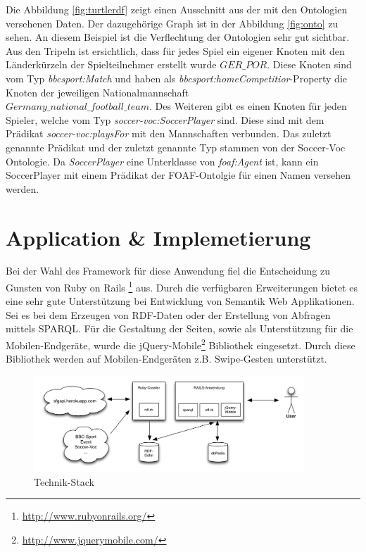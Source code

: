 \documentclass[runningheads,a4paper]{llncs}
\begin{document}
Die Abbildung \ref{fig:turtlerdf} zeigt einen Ausschnitt aus der mit den Ontologien versehenen Daten. Der dazugehörige Graph ist in der Abbildung \ref{fig:onto} zu sehen. An diesem Beispiel ist die Verflechtung der Ontologien sehr gut sichtbar.
Aus den Tripeln ist ersichtlich, dass für jedes Spiel ein eigener Knoten mit den Länderkürzeln der Spielteilnehmer erstellt wurde \(GER\_POR\). Diese Knoten sind vom Typ \textit{bbcsport:Match} und haben als \textit{bbcsport:homeCompetitior}-Property die Knoten der jeweiligen Nationalmannschaft\\ \(Germany\_national\_football\_team\). 
Des Weiteren gibt es einen Knoten für jeden Spieler, welche vom Typ \textit{soccer-voc:SoccerPlayer} sind. Diese sind mit dem Prädikat \textit{soccer-voc:playsFor} mit den Mannschaften verbunden. Das zuletzt genannte Prädikat und der zuletzt genannte Typ stammen von der Soccer-Voc Ontologie. Da \textit{SoccerPlayer} eine Unterklasse von \textit{foaf:Agent} ist, kann ein SoccerPlayer mit einem Prädikat der FOAF-Ontolgie für einen Namen versehen werden.
\section{Application \& Implemetierung}


Bei der Wahl des Framework für diese Anwendung fiel die Entscheidung zu Gunsten von Ruby on Rails \footnote{\url{http://www.rubyonrails.org/}} aus. Durch die verfügbaren Erweiterungen bietet es eine sehr gute Unterstützung bei Entwicklung von Semantik Web Applikationen. Sei es bei dem Erzeugen von RDF-Daten oder der Erstellung von Abfragen mittels SPARQL. Für die Gestaltung der Seiten, sowie als Unterstützung für die Mobilen-Endgeräte, wurde die jQuery-Mobile\footnote{\url{http://www.jquerymobile.com/}} Bibliothek eingesetzt. Durch diese Bibliothek werden auf Mobilen-Endgeräten z.B. Swipe-Gesten unterstützt. 

\begin{figure}
\centering
\includegraphics[height=3.6cm]{technik-stack}
\caption{Technik-Stack}
\label{fig:example}
\end{figure}
\end{document}
